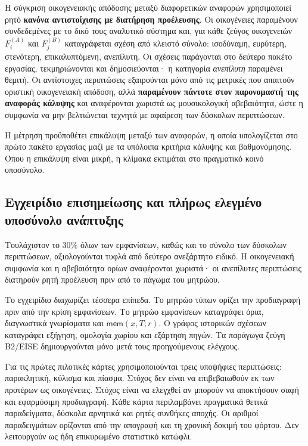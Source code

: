 \documentclass[11pt,a4paper]{article}
\begin{document}
Η σύγκριση οικογενειακής απόδοσης μεταξύ διαφορετικών αναφορών χρησιμοποιεί ρητό \textbf{κανόνα αντιστοίχισης με διατήρηση προέλευσης}. Οι οικογένειες παραμένουν συνδεδεμένες με το δικό τους αναλυτικό σύστημα και, για κάθε ζεύγος οικογενειών \(F_i^{(A)}\) και \(F_j^{(B)}\) καταγράφεται σχέση από κλειστό σύνολο: ισοδύναμη, ευρύτερη, στενότερη, επικαλυπτόμενη, ανεπίλυτη. Οι σχέσεις παράγονται στο δεύτερο πακέτο εργασίας, τεκμηριώνονται και δημοσιεύονται· η κατηγορία \emph{ανεπίλυτη} παραμένει θεμιτή. Οι αντίστοιχες περιπτώσεις εξαιρούνται μόνο από τις μετρικές που απαιτούν οριστική οικογενειακή απόδοση, αλλά \textbf{παραμένουν πάντοτε στον παρονομαστή της αναφοράς κάλυψης} και αναφέρονται χωριστά ως μουσικολογική αβεβαιότητα, ώστε η συμφωνία να μην βελτιώνεται τεχνητά με αφαίρεση των δύσκολων περιπτώσεων.

Η μέτρηση προϋποθέτει επικάλυψη μεταξύ των αναφορών, η οποία υπολογίζεται στο πρώτο πακέτο εργασίας μαζί με τα υπόλοιπα κριτήρια κάλυψης και βαθμονόμησης. Όπου η επικάλυψη είναι μικρή, η κλίμακα εκτιμάται στο πραγματικό κοινό υποσύνολο.

\subsection{Εγχειρίδιο επισημείωσης και πλήρως ελεγμένο υποσύνολο ανάπτυξης}\label{app:corpora-annotation-pilot}
Τουλάχιστον το $30\%$ όλων των εμφανίσεων, καθώς και το σύνολο των δύσκολων περιπτώσεων, αξιολογούνται τυφλά από δεύτερο ανεξάρτητο ειδικό. Η οικογενειακή συμφωνία και η αβεβαιότητα ορίων αναφέρονται χωριστά· οι ανεπίλυτες περιπτώσεις διατηρούν ρητή προέλευση πριν από το πάγωμα του μητρώου.

Το εγχειρίδιο διαχωρίζει τέσσερα επίπεδα. Το μητρώο τύπων ορίζει την προδιαγραφή πριν από την κρίση εμφανίσεων. Το μητρώο εμφανίσεων καταγράφει όρια, διαγνωστικά γνωρίσματα και $\mathsf{mem}(x,T;r)$. Ο γράφος ιστορικών σχέσεων καταγράφει εξήγηση, ομολογία χωρίου και εξάρτηση πηγών. Τα παράγωγα ζεύγη B2/EISE δημιουργούνται μόνο μετά τους προηγούμενους ελέγχους.

Για τις πρώτες πιλοτικές κάρτες χρησιμοποιούνται τρεις υποψήφιες περιπτώσεις: παρακλητική, κύλισμα και πίασμα. Στόχος δεν είναι να επιβεβαιωθούν εκ των προτέρων ως οικογένειες. Στόχος είναι να ελεγχθεί αν μπορούν να αποκτήσουν σαφή και εφαρμόσιμη προδιαγραφή. Κάθε κάρτα περιλαμβάνει πραγματικά θετικά παραδείγματα, δύσκολα αρνητικά και ρητές συνθήκες αποχής. Οι αριθμοί παραδειγμάτων ορίζονται από την απογραφή και τη χρονική δοκιμή του φόρτου. Δεν λειτουργούν ως ήδη επικυρωμένο στατιστικό κατώφλι.
\end{document}
